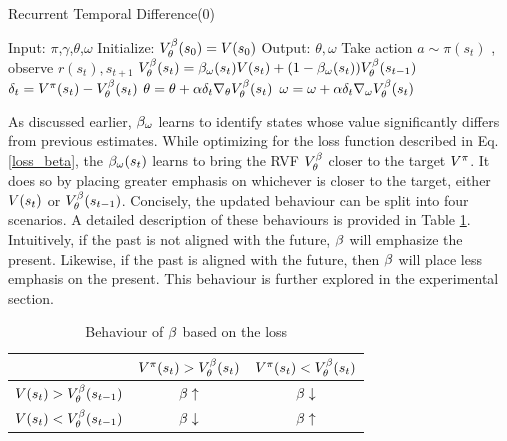 \begin{algorithm}[H]
\caption{Recurrent Temporal Difference(0)}
\begin{spacing}{1.2}
\begin{algorithmic}[1]
    \label{RTD}
    \State Input: $\pi$,$\gamma$,$\theta$,$\omega$
    \State Initialize: $V^{\beta}_{\theta}(s_0) = V(s_0)$
    \State Output: $\theta,\omega$ 
        \State Take action $a \sim \pi(s_t)$ , observe $r(s_t),s_{t+1}$
        \State $V^{\beta}_{\theta}(s_t) = \beta_{\omega}(s_t) V(s_t) + (1-\beta_{\omega}(s_t)) V^{\beta}_{\theta} (s_{t-1})$ 
        \State $\delta_t = V^{\pi}(s_t) - V^{\beta}_{\theta}(s_t)$ 
        \State $\theta = \theta + \alpha \delta_t \nabla_{\theta} V^{\beta}_{\theta}(s_t) $ 
        \State $\omega = \omega + \alpha \delta_t \nabla_{\omega} V^{\beta}_{\theta}(s_t)$ 
    \EndFor
\end{algorithmic}
\label{algo_rtd}
\end{spacing}
\end{algorithm}

As discussed earlier, $\beta_{\omega}$ learns to identify states whose value significantly differs from previous estimates. While optimizing for the loss function described in Eq. \ref{loss_beta}, the $\beta_{\omega}(s_t)$ learns to bring the RVF $V^{\beta}_{\theta}$ closer to the target $V^{\pi}$. It does so by placing greater emphasis on whichever is closer to the target, either $V(s_t)$ or $V^{\beta}_{\theta}(s_{t-1})$. Concisely, the updated behaviour can be split into four scenarios. A detailed description of these behaviours is provided in Table \ref{sample-table}. Intuitively, if the past is not aligned with the future, $\beta$ will emphasize the present. Likewise, if the past is aligned with the future, then $\beta$ will place less emphasis on the present. This behaviour is further explored in the experimental section.

\begin{table}[h]
\caption{Behaviour of $\beta$ based on the loss}
\centering
\begin{tabular}{c|c c } 
  & \small{$V^{\pi}(s_t)>V^{\beta}_{\theta}(s_t)$} & \small{$V^{\pi}(s_t)<V^{\beta}_{\theta}(s_t)$} \\ 
   \hline
 \small{$V(s_t)>V^{\beta}_{\theta}(s_{t-1})$} & $\beta \uparrow$ &  $\beta \downarrow$ \\ 
 \small{$V(s_t)<V^{\beta}_{\theta}(s_{t-1})$} & $\beta \downarrow$ & $\beta \uparrow$  \\ 
\end{tabular}
\vspace{7pt}
\label{sample-table}
\end{table}

